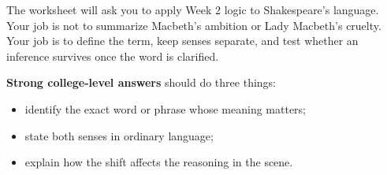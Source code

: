 \documentclass[12pt]{article}
\begin{document}
The worksheet will ask you to apply Week 2 logic to Shakespeare's language. Your job is not to summarize Macbeth's ambition or Lady Macbeth's cruelty. Your job is to define the term, keep senses separate, and test whether an inference survives once the word is clarified.

\textbf{Strong college-level answers} should do three things:

\begin{itemize}[leftmargin=1.5em,itemsep=0.2em]
\item identify the exact word or phrase whose meaning matters;
\item state both senses in ordinary language;
\item explain how the shift affects the reasoning in the scene.
\end{itemize}
\end{document}
